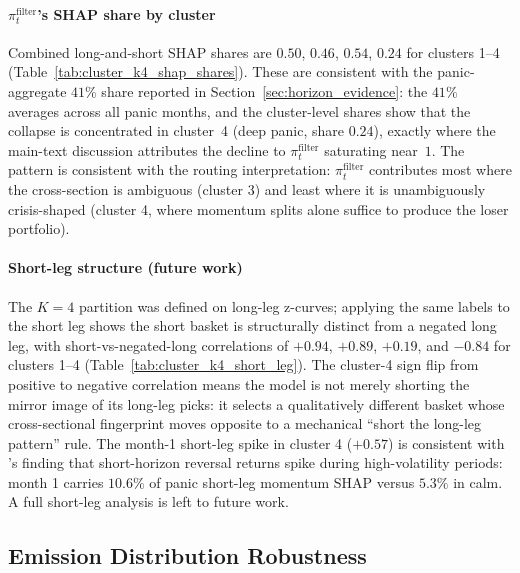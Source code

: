 \paragraph{$\pi_t^{\text{filter}}$'s SHAP share by cluster}
Combined long-and-short SHAP shares are $0.50$, $0.46$, $0.54$, $0.24$ for clusters 1--4 (Table~\ref{tab:cluster_k4_shap_shares}). These are consistent with the panic-aggregate $41\%$ share reported in Section~\ref{sec:horizon_evidence}: the $41\%$ averages across all panic months, and the cluster-level shares show that the collapse is concentrated in cluster~4 (deep panic, share $0.24$), exactly where the main-text discussion attributes the decline to $\pi_t^{\text{filter}}$ saturating near~$1$. The pattern is consistent with the routing interpretation: $\pi_t^{\text{filter}}$ contributes most where the cross-section is ambiguous (cluster 3) and least where it is unambiguously crisis-shaped (cluster 4, where momentum splits alone suffice to produce the loser portfolio).



\paragraph{Short-leg structure (future work)}
The $K=4$ partition was defined on long-leg z-curves; applying the same labels to the short leg shows the short basket is structurally distinct from a negated long leg, with short-vs-negated-long correlations of $+0.94$, $+0.89$, $+0.19$, and $-0.84$ for clusters 1--4 (Table~\ref{tab:cluster_k4_short_leg}). The cluster-4 sign flip from positive to negative correlation means the model is not merely shorting the mirror image of its long-leg picks: it selects a qualitatively different basket whose cross-sectional fingerprint moves opposite to a mechanical ``short the long-leg pattern'' rule. The month-1 short-leg spike in cluster 4 ($+0.57$) is consistent with \citet{Nagel2012}'s finding that short-horizon reversal returns spike during high-volatility periods: month 1 carries $10.6\%$ of panic short-leg momentum SHAP versus $5.3\%$ in calm. A full short-leg analysis is left to future work.



\subsection{Emission Distribution Robustness}\label{app:emission_robustness}

